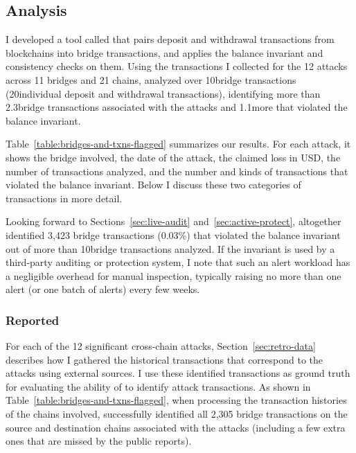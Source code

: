 \subsection{Analysis}

\label{sec:retro-analysis}


I developed a tool called \offlinetool that pairs deposit and
withdrawal transactions from blockchains into bridge transactions, and
applies the balance invariant and consistency checks on them.  Using
the transactions I collected for the 12 attacks across 11 bridges and
21 chains, \offlinetool analyzed over 10\mil bridge transactions (20\mil individual deposit and withdrawal transactions),
identifying more than 2.3\thou bridge transactions associated with the
attacks and 1.1\thou more that violated the balance invariant.


Table~\ref{table:bridges-and-txns-flagged} summarizes our results.
For each attack, it shows the bridge involved, the date of the attack,
the claimed loss in USD, the number of transactions \offlinetool
analyzed, and the number and kinds of transactions that violated the
balance invariant.
%
Below I discuss these two categories of transactions in more detail.

Looking forward to Sections~\ref{sec:live-audit}
and~\ref{sec:active-protect}, altogether \offlinetool identified 3,423
bridge transactions (0.03\%) that violated the balance invariant out
of more than 10\mil bridge transactions analyzed.  If the invariant is used by a
third-party auditing or protection system, I note that such an alert
workload has a negligible overhead for manual inspection, typically
raising no more than one alert (or one batch of alerts) every few
weeks.

\subsubsection{Reported}

For each of the 12 significant cross-chain attacks,
Section~\ref{sec:retro-data} describes how I gathered the historical
transactions that correspond to the attacks using external sources.
I use these identified transactions as ground truth for evaluating
the ability of \offlinetool to identify attack transactions.  As shown
in Table~\ref{table:bridges-and-txns-flagged}, when processing the
transaction histories of the chains involved, \offlinetool
successfully identified all 2,305 bridge transactions on the source
and destination chains associated with the attacks (including a few extra ones that are missed by the public reports).

